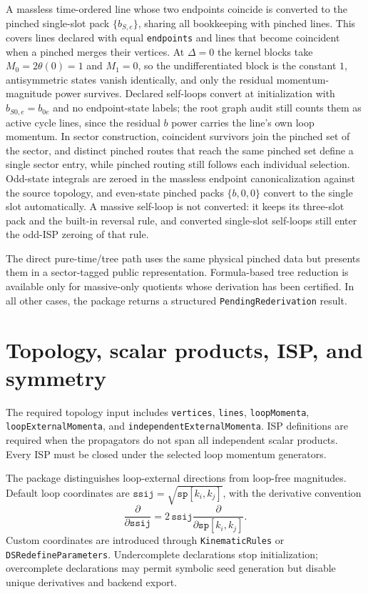 ﻿\documentclass[a4paper,11pt]{article}
\begin{document}
A massless time-ordered line whose two endpoints coincide is converted to the pinched single-slot
pack $\{b_{S,e}\}$, sharing all bookkeeping with pinched lines. This covers lines declared with
equal \texttt{endpoints} and lines that become coincident when a pinched merges their vertices.
At $\Delta=0$ the kernel blocks take $M_0=2\theta(0)=1$ and $M_1=0$, so the undifferentiated
block is the constant $1$, antisymmetric states vanish identically, and only the residual
momentum-magnitude power survives. Declared self-loops convert at initialization with
$b_{S0,e}=b_{0e}$ and no endpoint-state labels; the root graph audit still counts them as
active cycle lines, since the residual $b$ power carries the line's own loop momentum. In
sector construction, coincident survivors join the pinched set of the sector, and distinct
pinched routes that reach the same pinched set define a single sector entry, while pinched
routing still follows each individual selection. Odd-state integrals are zeroed in the massless
endpoint canonicalization against the source topology, and even-state pinched packs
$\{b,0,0\}$ convert to the single slot automatically. A massive self-loop is not converted: it
keeps its three-slot pack and the built-in reversal rule, and converted single-slot self-loops
still enter the odd-ISP zeroing of that rule.

The direct pure-time/tree path uses the same physical pinched data but presents them in a
sector-tagged public representation. Formula-based tree reduction is available only for
massive-only quotients whose derivation has been certified. In all other cases, the package
returns a structured \texttt{PendingRederivation} result.

\section{Topology, scalar products, ISP, and symmetry}

The required topology input includes \texttt{vertices}, \texttt{lines},
\texttt{loopMomenta}, \texttt{loopExternalMomenta}, and
\texttt{independentExternalMomenta}. ISP definitions are required when the propagators do
not span all independent scalar products. Every ISP must be closed under the selected loop
momentum generators.

The package distinguishes loop-external directions from loop-free magnitudes. Default loop
coordinates are $\texttt{ssij}=\sqrt{\texttt{sp}[k_i,k_j]}$, with the derivative convention
\begin{equation}
 \frac{\partial}{\partial\texttt{ssij}}
 =2\,\texttt{ssij}\frac{\partial}{\partial\texttt{sp}[k_i,k_j]}.
 \label{handbookRootDerivative}
\end{equation}
Custom coordinates are introduced through \texttt{KinematicRules} or
\texttt{DSRedefineParameters}. Undercomplete declarations stop initialization;
overcomplete declarations may permit symbolic seed generation but disable unique
derivatives and backend export.
\end{document}
